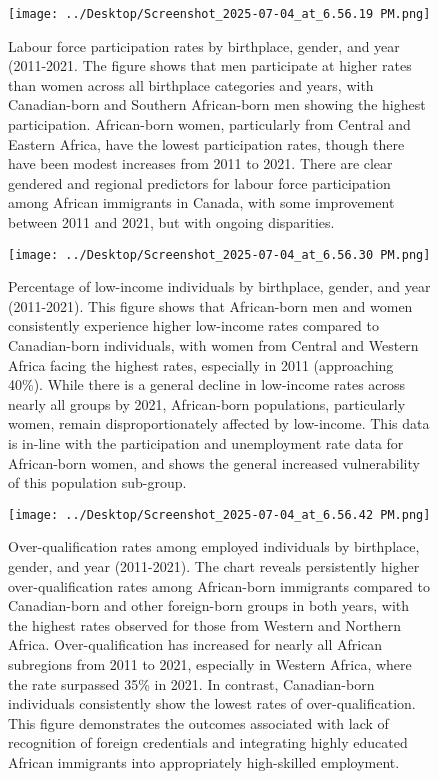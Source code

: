 \documentclass[12pt]{article}
\begin{document}
\begin{figure}[h!]
    \centering
    \texttt{[image: ../Desktop/Screenshot\_2025-07-04\_at\_6.56.19 PM.png]}
    \caption{Labour force participation rates by birthplace, gender, and year (2011-2021. The figure shows that men participate at higher rates than women across all birthplace categories and years, with Canadian-born and Southern African-born men showing the highest participation. African-born women, particularly from Central and Eastern Africa, have the lowest participation rates, though there have been modest increases from 2011 to 2021. There are clear gendered and regional predictors for labour force participation among African immigrants in Canada, with some improvement between 2011 and 2021, but with ongoing disparities.}
\end{figure}

\begin{figure}[h!]
    \centering
    \texttt{[image: ../Desktop/Screenshot\_2025-07-04\_at\_6.56.30 PM.png]}
    \caption{Percentage of low-income individuals by birthplace, gender, and year (2011-2021). This figure shows that African-born men and women consistently experience higher low-income rates compared to Canadian-born individuals, with women from Central and Western Africa facing the highest rates, especially in 2011 (approaching 40\%). While there is a general decline in low-income rates across nearly all groups by 2021, African-born populations, particularly women, remain disproportionately affected by low-income. This data is in-line with the participation and unemployment rate data for African-born women, and shows the general increased vulnerability of this population sub-group.}
\end{figure}

\begin{figure}[h!]
    \centering
    \texttt{[image: ../Desktop/Screenshot\_2025-07-04\_at\_6.56.42 PM.png]}
    \caption{Over-qualification rates among employed individuals by birthplace, gender, and year (2011-2021). The chart reveals persistently higher over-qualification rates among African-born immigrants compared to Canadian-born and other foreign-born groups in both years, with the highest rates observed for those from Western and Northern Africa. Over-qualification has increased for nearly all African subregions from 2011 to 2021, especially in Western Africa, where the rate surpassed 35\% in 2021. In contrast, Canadian-born individuals consistently show the lowest rates of over-qualification. This figure demonstrates the outcomes associated with lack of recognition of foreign credentials and integrating highly educated African immigrants into appropriately high-skilled employment.}
\end{figure}
\end{document}
